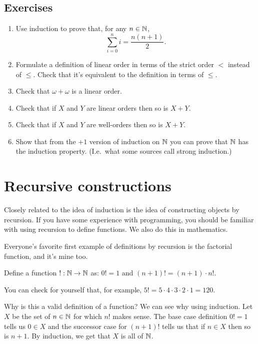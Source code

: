 \documentclass[10pt]{amsart}
\begin{document}

\subsection*{Exercises}

\begin{enumerate}
\item Use induction to prove that, for any $n \in \mathbb{N}$,
\[
\sum_{i=0}^n i = \frac{n(n+1)}{2}.
\]
\item Formulate a definition of linear order in terms of the strict order $<$ instead of $\le$. Check that it's equivalent to the definition in terms of $\le$.
\item Check that $\omega + \omega$ is a linear order.
\item Check that if $X$ and $Y$ are linear orders then so is $X+Y$.
\item Check that if $X$ and $Y$ are well-orders then so is $X+Y$.
\item Show that from the $+1$ version of induction on $\mathbb{N}$ you can prove that $\mathbb{N}$ has the induction property. (I.e.\ what some sources call strong induction.)
\end{enumerate}

\newpage

\section{Recursive constructions}

Closely related to the idea of induction is the idea of constructing objects by recursion. If you have some experience with programming, you should be familiar with using recursion to define functions. We also do this in mathematics.

Everyone's favorite first example of definitions by recursion is the factorial function, and it's mine too. 

\begin{example}
Define a function $\mathord{!} : \mathbb{N} \to \mathbb{N}$ as: $0! = 1$ and $(n+1)! = (n+1) \cdot n!$.
\end{example}

You can check for yourself that, for example, $5! = 5\cdot4\cdot3\cdot2\cdot1 = 120$.

Why is this a valid definition of a function? We can see why using induction. Let $X$ be the set of $n \in \mathbb{N}$ for which $n!$ makes sense. The base case definition $0! = 1$ tells us $0 \in X$ and the successor case for $(n+1)!$ tells us that if $n \in X$ then so is $n+1$. By induction, we get that $X$ is all of $\mathbb{N}$.
\end{document}
